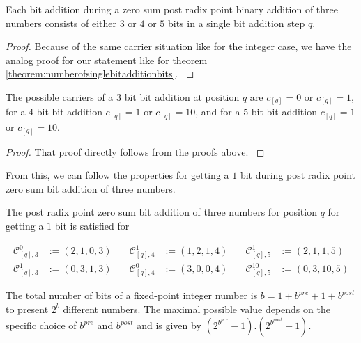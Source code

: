 \begin{theorem}
    Each bit addition during a zero sum post radix point binary addition of three numbers consists of either $3$ or $4$ or $5$ bits in a single bit addition step $q$.
\label{theorem:numberofsinglebitadditionbits_fixedpointinteger}
\end{theorem}

\begin{proof}
    Because of the same carrier situation like for the integer case, we have the analog proof for our statement like for theorem \ref{theorem:numberofsinglebitadditionbits}.
\label{proof:numberofsinglebitadditionbits_fixedpointinteger}
\end{proof}


\begin{theorem}
    The possible carriers of a $3$ bit bit addition at position $q$ are $c_{[q]} = 0$ or $c_{[q]} = 1$, for a $4$ bit bit addition $c_{[q]} = 1$ or $c_{[q]} = 10$, and for a $5$ bit bit addition $c_{[q]} = 1$ or $c_{[q]} = 10$.
\label{theorem:carriersfor34and5bitbitadditions_fixedpointinteger}
\end{theorem}

\begin{proof}
    That proof directly follows from the proofs above.
\label{proof:carriersfor34and5bitbitadditions_fixedpointinteger}
\end{proof}

From this, we can follow the properties for getting a $1$ bit during post radix point zero sum bit addition of three numbers.

\begin{definition}
    
    The post radix point zero sum bit addition of three numbers for position $q$ for getting a $1$ bit is satisfied for

    \begin{equation}
        \begin{aligned}
                \mathcal{C}^{0}_{[q],3} &:= \left(2, 1, 0, 3\right) \quad & \mathcal{C}^{1}_{[q],4} &:= \left(1, 2, 1, 4\right) \quad & \mathcal{C}^{1}_{[q],5} &:= \left(2, 1, 1, 5\right)\\
                \mathcal{C}^{1}_{[q],3} &:= \left(0, 3, 1, 3\right) \quad & \mathcal{C}^{0}_{[q],4} &:= \left(3, 0, 0, 4\right) \quad & \mathcal{C}^{10}_{[q],5} &:= \left(0, 3, 10, 5\right)
            \label{eq:zerosumbitadditionproperties_fixedpointinteger}
        \end{aligned}
    \end{equation}

\label{def:zerosumbitadditionproperties_fixedpointinteger}
\end{definition}

The total number of bits of a fixed-point integer number is $b = 1 + b^{pre} + 1 + b^{post}$ to present $2^{b}$ different numbers. The maximal possible value depends on the specific choice of $b^{pre}$ and $b^{post}$ and is given by $\left(2^{b^{pre}}-1\right).\left(2^{b^{post}} - 1\right)$.
